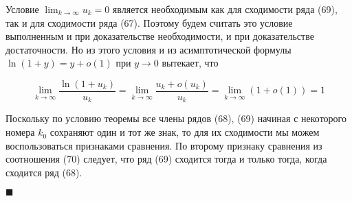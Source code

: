 Условие $\displaystyle\lim_{k \rightarrow \infty} u_k = 0$ является необходимым как для сходимости ряда (69), так и для сходимости ряда (67). Поэтому будем считать это условие выполненным и при доказательстве необходимости, и при доказательстве достаточности. Но из этого условия и из асимптотической формулы $\ln (1 + y) = y + o(1)$ при $y \rightarrow 0$ вытекает, что

\begin{equation}
	\displaystyle\lim_{k \rightarrow \infty} \frac{\ln (1 + u_k)}{u_k} = \displaystyle\lim_{k \rightarrow \infty} \frac{u_k + o(u_k)}{u_k} = \displaystyle\lim_{k \rightarrow \infty} (1 + o(1)) = 1
\end{equation}

Поскольку по условию теоремы все члены рядов (68), (69) начиная с некоторого номера $k_0$ сохраняют один и тот же знак, то для их сходимости мы можем воспользоваться признаками сравнения. По второму признаку сравнения из соотношения (70) следует, что ряд (69) сходится тогда и только тогда, когда сходится ряд (68).

\begin{flushright}
	$\blacksquare$
\end{flushright}